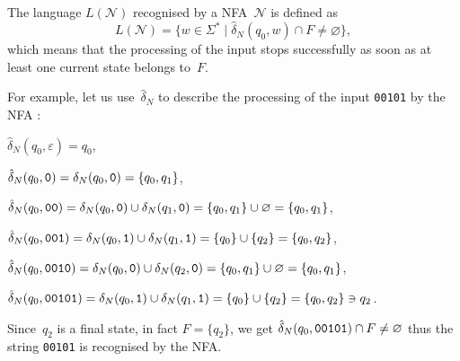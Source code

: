 The language \(L(\mathcal{N})\) recognised by a NFA~\(\mathcal{N}\) is
defined as
\begin{equation*}
L(\mathcal{N}) = \{w \in \Sigma^{*} \; \lvert \; \hat{\delta}_N (q_0, w)
\cap F \neq \varnothing\},
\end{equation*}
which means that the processing of the input stops successfully as
soon as at least one current state belongs to~\(F\).

For example, let us use~\(\hat{\delta}_N\) to describe the processing
of the input \verb+00101+ by the NFA :
\begin{enumerate*}

  \item \(\hat{\delta}_N (q_0, \varepsilon) = q_0\),

  \item \(\hat{\delta}_N (q_0, \verb+0+) = \delta_N (q_0, \verb+0+) =
    \{q_0, q_1\}\),

  \item \(\hat{\delta}_N (q_0, \verb+00+) = \delta_N (q_0, \verb+0+)
    \cup \delta_N (q_1, \verb+0+) = \{q_0, q_1\} \cup \varnothing =
    \{q_0, q_1\}\),

  \item \(\hat{\delta}_N (q_0, \verb+001+) = \delta_N (q_0, \verb+1+)
    \cup \delta_N (q_1, \verb+1+) = \{q_0\} \cup \{q_2\} = \{q_0,
    q_2\}\),

  \item \(\hat{\delta}_N (q_0, \verb+0010+) = \delta_N (q_0, \verb+0+)
    \cup \delta_N (q_2, \verb+0+) = \{q_0, q_1\} \cup \varnothing =
    \{q_0, q_1\}\),

  \item \(\hat{\delta}_N (q_0, \verb+00101+) = \delta_N (q_0,
    \verb+1+) \cup \delta_N (q_1, \verb+1+) = \{q_0\} \cup \{q_2\} =
    \{q_0, q_2\} \ni q_2\).

\end{enumerate*}
Since~\(q_2\) is a final state, in fact \(F = \{q_2\}\), we get
\(\hat{\delta}_N (q_0, \verb+00101+) \cap F \neq \varnothing\) thus
the string \verb+00101+ is recognised by the NFA.
